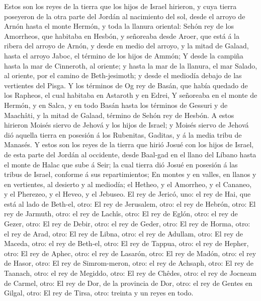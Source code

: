  Estos son los reyes de la tierra que los hijos de Israel
hirieron, y cuya tierra poseyeron de la otra parte del Jordán al
nacimiento del sol, desde el arroyo de Arnón hasta el monte Hermón, y
toda la llanura oriental:  Sehón rey de los Amorrheos, que
habitaba en Hesbón, y señoreaba desde Aroer, que está á la ribera del
arroyo de Arnón, y desde en medio del arroyo, y la mitad de Galaad,
hasta el arroyo Jaboc, el término de los hijos de Ammón; 
Y desde la campiña hasta la mar de Cinneroth, al oriente; y hasta la mar
de la llanura, el mar Salado, al oriente, por el camino de
Beth-jesimoth; y desde el mediodía debajo de las vertientes del Pisga.
 Y los términos de Og rey de Basán, que había quedado de
los Rapheos, el cual habitaba en Astaroth y en Edrei,  Y
señoreaba en el monte de Hermón, y en Salca, y en todo Basán hasta los
términos de Gessuri y de Maachâti, y la mitad de Galaad, término de
Sehón rey de Hesbón.  A estos hirieron Moisés siervo de
Jehová y los hijos de Israel; y Moisés siervo de Jehová dió aquella
tierra en posesión á los Rubenitas, Gaditas, y á la media tribu de
Manasés.  Y estos son los reyes de la tierra que hirió
Josué con los hijos de Israel, de esta parte del Jordán al occidente,
desde Baal-gad en el llano del Líbano hasta el monte de Halac que sube á
Seir; la cual tierra dió Josué en posesión á las tribus de Israel,
conforme á sus repartimientos;  En montes y en valles, en
llanos y en vertientes, al desierto y al mediodía; el Hetheo, y el
Amorrheo, y el Cananeo, y el Pherezeo, y el Heveo, y el Jebuseo.
 El rey de Jericó, uno: el rey de Hai, que está al lado de
Beth-el, otro:  El rey de Jerusalem, otro: el rey de
Hebrón, otro:  El rey de Jarmuth, otro: el rey de Lachîs,
otro:  El rey de Eglón, otro: el rey de Gezer, otro:
 El rey de Debir, otro: el rey de Geder, otro:
 El rey de Horma, otro: el rey de Arad, otro:
 El rey de Libna, otro: el rey de Adullam, otro:
 El rey de Maceda, otro: el rey de Beth-el, otro:
 El rey de Tappua, otro: el rey de Hepher, otro:
 El rey de Aphec, otro: el rey de Lasarón, otro:
 El rey de Madón, otro: el rey de Hasor, otro:
 El rey de Simrom-meron, otro: el rey de Achsaph, otro:
 El rey de Taanach, otro: el rey de Megiddo, otro:
 El rey de Chêdes, otro: el rey de Jocneam de Carmel,
otro:  El rey de Dor, de la provincia de Dor, otro: el
rey de Gentes en Gilgal, otro:  El rey de Tirsa, otro:
treinta y un reyes en todo.

